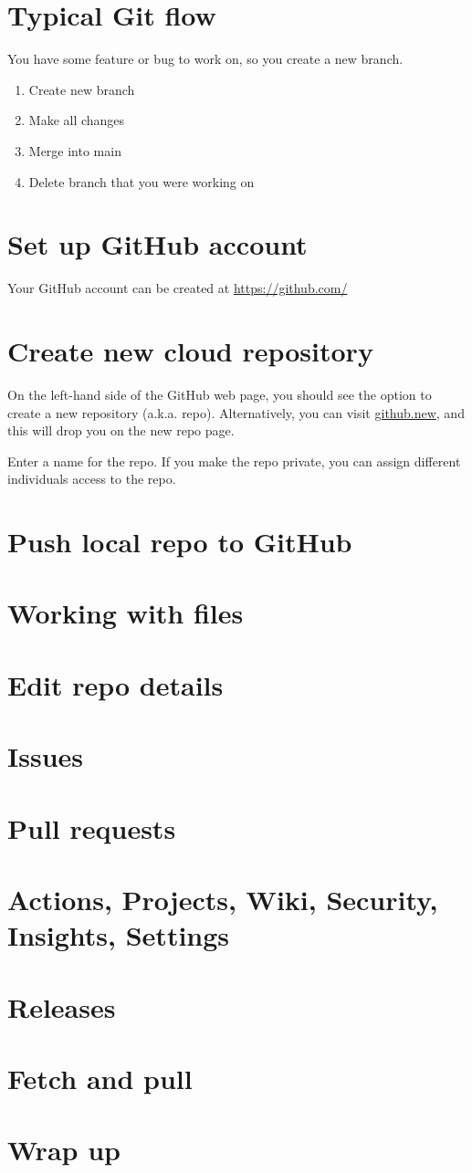 \documentclass[12pt]{article}
\begin{document}
\section{Typical Git flow}
You have some feature or bug to work on, so you create a new branch.
\begin{enumerate}[nosep]
\item Create new branch
\item Make all changes
\item Merge into main
\item Delete branch that you were working on
\end{enumerate}


\section{Set up GitHub account}
Your GitHub account can be created at \href{https://github.com/}{https://github.com/}

\section{Create new cloud repository}
On the left-hand side of the GitHub web page, you should see the option to create a new repository (a.k.a. repo). Alternatively,  you can visit \href{github.new}{github.new}, and this will drop you on the new repo page.\par

Enter a name for the repo. If you make the repo private, you can assign different individuals access to the repo.

\section{Push local repo to GitHub}
\section{Working with files}
\section{Edit repo details}
\section{Issues}
\section{Pull requests}
\section{Actions, Projects, Wiki, Security, Insights, Settings}
\section{Releases}
\section{Fetch and pull}
\section{Wrap up}
\end{document}

